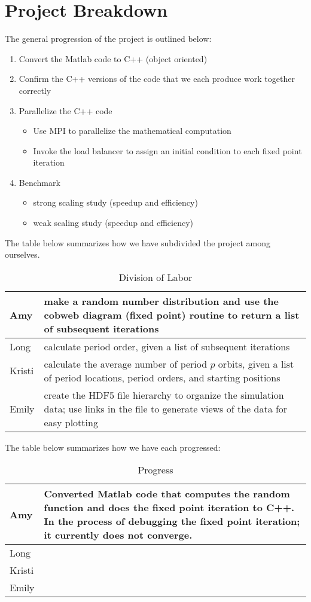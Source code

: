 \documentclass[12pt]{article}
\newcommand{\be}{\begin{enumerate}}
\newcommand{\ee}{\end{enumerate}}
\newcommand{\bi}{\begin{itemize}}
\newcommand{\ei}{\end{itemize}}
\begin{document}
\section{Project Breakdown}
The general progression of the project is outlined below:
\be
\item Convert the Matlab code to C++ (object oriented)
\item Confirm the C++ versions of the code that we each produce work
  together correctly
\item Parallelize the C++ code
\bi
\item Use MPI to parallelize the mathematical computation
\item Invoke the load balancer to assign an initial condition to each
  fixed point iteration \cite{dlb}
\ei
\item Benchmark 
\bi
\item strong scaling study (speedup and efficiency)
\item weak scaling study (speedup and efficiency)
\ei
\ee

\noindent The table below summarizes how we have subdivided the project among
ourselves. 
\begin {table}[H]
\centering
\caption{Division of Labor}
    \begin{tabular}{ |p{1cm}|p{10cm}|} 
    \hline
    Amy &  make a random number distribution and use the cobweb
    diagram (fixed point) routine to return a list of subsequent iterations\\ \hline
    Long & calculate period order, given a list of subsequent iterations  \\ \hline
    Kristi & calculate the average number of period $p$ orbits, given
    a list of period locations, period orders, and starting positions\\ \hline
    Emily  & create the HDF5 file hierarchy to organize the simulation
    data; use links in the file to generate views of the data for easy
    plotting\\ \hline
    \end{tabular}
\end{table}

\noindent The table below summarizes how we have each progressed:
\begin {table}[H]
\centering
\caption{Progress}
    \begin{tabular}{ |p{1cm}|p{10cm}|} 
    \hline
    Amy &  Converted Matlab code that computes the random function and
    does the fixed point iteration to C++. In the process of debugging
    the fixed point iteration; it currently does not converge. \\ \hline
    Long & \\ \hline
    Kristi & \\ \hline
    Emily  & \\ \hline
    \end{tabular}
\end{table}
\end{document}
